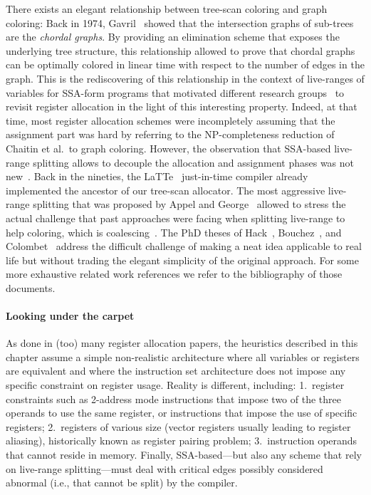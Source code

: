 {There exists an elegant relationship between tree-scan coloring and graph coloring:
Back in 1974, Gavril~\cite{Gavril:1974:JCS} showed that the intersection graphs of sub-trees are the \emph{chordal graphs}.
By providing an elimination scheme that exposes the underlying tree structure, this relationship allowed to prove that chordal graphs can be optimally colored in linear time with respect to the number of edges in the graph.
This is the rediscovering of this relationship in the context of live-ranges of variables for SSA-form programs that motivated different research groups~\cite{HGG:2005:RegisterSSA,brisk:2005:poly,pereira:2005:chordal,Bouchez06} to revisit register allocation in the light of this interesting property.
Indeed, at that time, most register allocation schemes were incompletely assuming that the assignment part was hard by referring to the NP-completeness reduction of Chaitin et al.\ to graph coloring.
However, the observation that SSA-based live-range splitting allows to decouple the allocation and assignment phases was not new~\cite{CyFe87,Fabr79}.
Back in the nineties, the LaTTe~\cite{yang1999latte} just-in-time compiler already implemented the ancestor of our tree-scan allocator.
The most aggressive live-range splitting that was proposed by Appel and George~\cite{appel97modern} allowed to stress the actual challenge that past approaches were facing when splitting live-range to help coloring, which is coalescing~\cite{BouchezDR07:coalescing-cplx}.
The PhD theses of Hack~\cite{Hack07a}, Bouchez~\cite{bouchez-phd}, and Colombet~\cite{colombet-phd} address the difficult challenge of making a neat idea applicable to real life but without trading the elegant simplicity of the original approach.
For some more exhaustive related work references we refer to the bibliography of those documents.

\paragraph{Looking under the carpet}
As done in (too) many register allocation papers, the heuristics described in this chapter assume a simple non-realistic architecture where all variables or registers are equivalent and where the instruction set architecture does not impose any specific constraint on register usage. 
Reality is different, including:
1.~register constraints such as 2-address mode instructions that impose two of the three operands to use the same register, or instructions that impose the use of specific registers;
2.~registers of various size (vector registers usually leading to register aliasing), historically known as register pairing problem;
3.~instruction operands that cannot reside in memory.
Finally, SSA-based---but also any scheme that rely on live-range splitting---must deal with critical edges possibly considered abnormal (i.e., that cannot be split) by the compiler.

}
